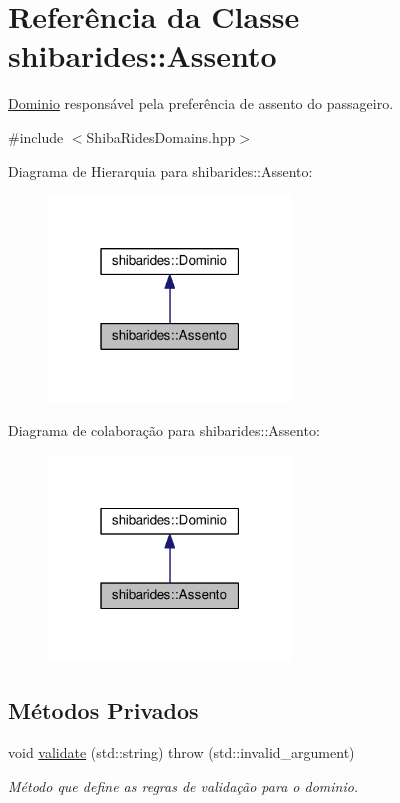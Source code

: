 \hypertarget{classshibarides_1_1Assento}{}\section{Referência da Classe shibarides\+:\+:Assento}
\label{classshibarides_1_1Assento}


\hyperlink{classshibarides_1_1Dominio}{Dominio} responsável pela preferência de assento do passageiro.  




{\ttfamily \#include $<$Shiba\+Rides\+Domains.\+hpp$>$}



Diagrama de Hierarquia para shibarides\+:\+:Assento\+:\nopagebreak
\begin{figure}[H]
\begin{center}
\leavevmode
\includegraphics[width=183pt]{classshibarides_1_1Assento__inherit__graph}
\end{center}
\end{figure}


Diagrama de colaboração para shibarides\+:\+:Assento\+:\nopagebreak
\begin{figure}[H]
\begin{center}
\leavevmode
\includegraphics[width=183pt]{classshibarides_1_1Assento__coll__graph}
\end{center}
\end{figure}
\subsection*{Métodos Privados}
\begin{DoxyCompactItemize}
\item 
void \hyperlink{classshibarides_1_1Assento_a8a2099562808c49caff59569bcb977c3}{validate} (std\+::string)  throw (std\+::invalid\+\_\+argument)
\begin{DoxyCompactList}\small\item\em Método que define as regras de validação para o dominio. \end{DoxyCompactList}\end{DoxyCompactItemize}
